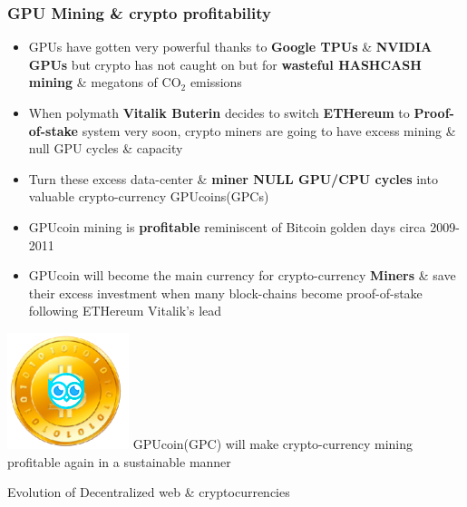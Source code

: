 \documentclass[10pt,handout]{beamer}
\begin{document}
\begin{frame}[t]\frametitle{GPU Mining \& crypto profitability}
\begin{itemize}[<+-| alert@+>]
\item GPUs have gotten very powerful thanks to \textbf{Google TPUs} \& \textbf{NVIDIA GPUs} but crypto has  not caught on but for \textbf{wasteful HASHCASH mining} \& megatons of CO$_2$ emissions
\item When polymath \textbf{Vitalik Buterin} decides to switch \textbf{ETHereum} to \textbf{Proof-of-stake} system very soon, crypto miners are going to have excess mining \& null GPU cycles \& capacity

\item Turn these excess data-center \& \textbf{miner NULL GPU/CPU cycles} into valuable crypto-currency GPUcoins(GPCs)
\item GPUcoin mining is \textbf{profitable} reminiscent of Bitcoin golden days circa 2009-2011
\item GPUcoin will become the main currency for crypto-currency \textbf{Miners} \& save their excess investment when many block-chains become proof-of-stake following ETHereum Vitalik's lead
\end{itemize}
\pause
\includegraphics[scale=0.1]{static/hootcoin} 
\Large{ GPUcoin(GPC) will make crypto-currency mining profitable again in a sustainable manner}

\end{frame}

\begin{frame}[t]{Evolution of Decentralized web \& cryptocurrencies}
 
\end{frame} 
\end{document}
